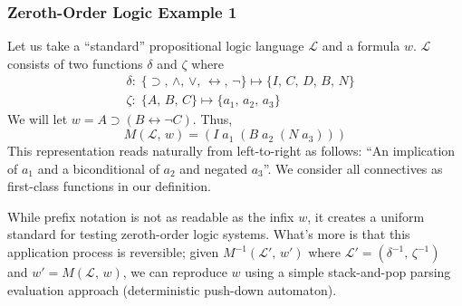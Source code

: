 \documentclass[ms]{uncgdissertationexp2}
\theoremstyle{plain}
\theoremstyle{definition}
\theoremstyle{remark}
\begin{document}
\subsubsection{Zeroth-Order Logic Example 1} Let us take a ``standard'' propositional logic language $\mathcal{L}$ and a formula $w$. $\mathcal{L}$ consists of two functions $\delta$ and $\zeta$ where
\begin{align*}
	  & \delta:\;\{\supset,\,\land,\,\lor,\,\leftrightarrow,\,\lnot\}\mapsto \{I,\,C,\,D,\,B,\,N\} \\
	  & \zeta:\;\{A,\,B,\,C\} \mapsto \{a_{1},\,a_{2},\,a_{3}\}                                   
\end{align*}
We will let $w = A \supset (B \leftrightarrow \lnot C)$. Thus, 
\[
	M(\mathcal{L},\,w) = (I\;a_{1}\;(B\;a_{2}\;(N\;a_{3})))
\]
This representation reads naturally from left-to-right as follows: ``An implication of $a_1$ and a biconditional of $a_2$ and negated $a_3$''. We consider all connectives as first-class functions in our definition.

While prefix notation is not as readable as the infix $w$, it creates a uniform standard for testing zeroth-order logic systems. What's more is that this application process is reversible; given $M^{-1}(\mathcal{L}',\,w')$ where $\mathcal{L}' = (\delta^{-1},\,\zeta^{-1})$ and $w' = M(\mathcal{L},\,w)$, we can reproduce $w$ using a simple stack-and-pop parsing evaluation approach (deterministic push-down automaton).
    
\end{document}
